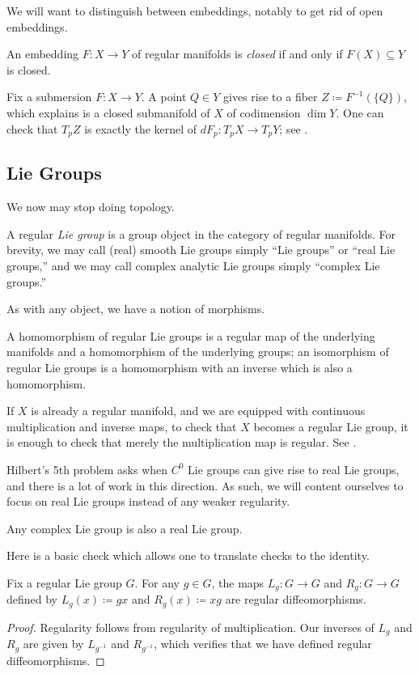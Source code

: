 \documentclass[../notes.tex]{subfiles}
\begin{document}
We will want to distinguish between embeddings, notably to get rid of open embeddings.
\begin{definition}[closed]
	An embedding $F\colon X\to Y$ of regular manifolds is \textit{closed} if and only if $F(X)\subseteq Y$ is closed.
\end{definition}
\begin{example}
	Fix a submersion $F\colon X\to Y$. A point $Q\in Y$ gives rise to a fiber $Z\coloneqq F^{-1}(\{Q\})$, which  explains is a closed submanifold of $X$ of codimension $\dim Y$. One can check that $T_pZ$ is exactly the kernel of $dF_p\colon T_pX\to T_pY$; see \cite[Proposition~5.37]{lee-manifolds}.
\end{example}

\subsection{Lie Groups}
We now may stop doing topology.
\begin{definition}
	A regular \textit{Lie group} is a group object in the category of regular manifolds. For brevity, we may call (real) smooth Lie groups simply ``Lie groups'' or ``real Lie groups,'' and we may call complex analytic Lie groups simply ``complex Lie groups.''
\end{definition}
As with any object, we have a notion of morphisms.
\begin{definition}[homomorphism]
	A homomorphism of regular Lie groups is a regular map of the underlying manifolds and a homomorphism of the underlying groups; an isomorphism of regular Lie groups is a homomorphism with an inverse which is also a homomorphism.
\end{definition}
\begin{remark}
	If $X$ is already a regular manifold, and we are equipped with continuous multiplication and inverse maps, to check that $X$ becomes a regular Lie group, it is enough to check that merely the multiplication map is regular. See \cite[Exercise~7-3]{lee-manifolds}.
\end{remark}
\begin{remark}
	Hilbert's 5th problem asks when $C^0$ Lie groups can give rise to real Lie groups, and there is a lot of work in this direction. As such, we will content ourselves to focus on real Lie groups instead of any weaker regularity.
\end{remark}
\begin{remark}
	Any complex Lie group is also a real Lie group.
\end{remark}
Here is a basic check which allows one to translate checks to the identity.
\begin{lemma}
	Fix a regular Lie group $G$. For any $g\in G$, the maps $L_g\colon G\to G$ and $R_g\colon G\to G$ defined by $L_g(x)\coloneqq gx$ and $R_g(x)\coloneqq xg$ are regular diffeomorphisms.
\end{lemma}
\begin{proof}
	Regularity follows from regularity of multiplication. Our inverses of $L_g$ and $R_g$ are given by $L_{g^{-1}}$ and $R_{g^{-1}}$, which verifies that we have defined regular diffeomorphisms.
\end{proof}
\end{document}
